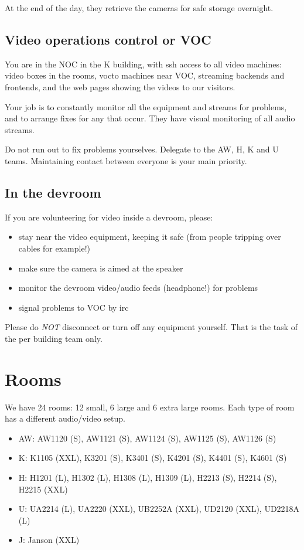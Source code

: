 \documentclass{article}
\begin{document}
At the end of the day, they retrieve the cameras for safe storage overnight.


\subsection{Video operations control or VOC}
You are in the NOC in the K building, with ssh access to all video machines: video boxes in the rooms, vocto machines near VOC, streaming backends and frontends, and the web pages showing the videos to our visitors.

Your job is to constantly monitor all the equipment and streams for problems, and to arrange fixes for any that occur. They have visual monitoring of all audio streams.

Do not run out to fix problems yourselves. Delegate to the AW, H, K and U teams. Maintaining contact between everyone is your main priority.

\subsection{In the devroom}
If you are volunteering for video inside a devroom, please:
\begin{itemize}
  \item stay near the video equipment, keeping it safe (from people tripping over cables for example!)
  \item make sure the camera is aimed at the speaker
  \item monitor the devroom video/audio feeds (headphone!) for problems
  \item signal problems to VOC by irc
\end{itemize}

Please do \emph{NOT} disconnect or turn off any equipment yourself. That is the task of the per building team only.

\section{Rooms}
We have 24 rooms: 12 small, 6 large and 6 extra large rooms. Each type of room has a different audio/video setup.
\begin{itemize}
  \item AW: AW1120 (S), AW1121 (S), AW1124 (S), AW1125 (S), AW1126 (S)
  \item K: K1105 (XXL), K3201 (S), K3401 (S), K4201 (S), K4401 (S), K4601 (S)
  \item H: H1201 (L), H1302 (L), H1308 (L), H1309 (L), H2213 (S), H2214 (S), H2215 (XXL)
  \item U: UA2214 (L), UA2220 (XXL), UB2252A (XXL), UD2120 (XXL), UD2218A (L)
  \item J: Janson (XXL)
\end{itemize}
\end{document}
